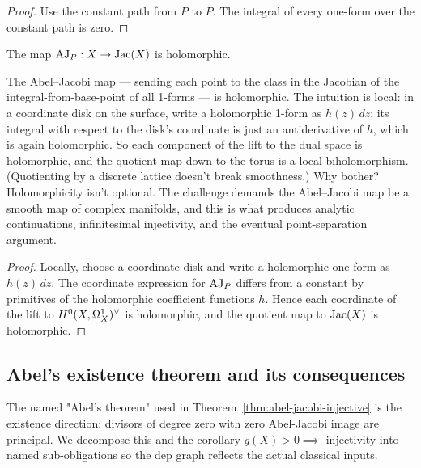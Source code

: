 \begin{proof}
\leanok
Use the constant path from \(P\) to \(P\). The integral of every one-form over
the constant path is zero.
\end{proof}

\begin{lemma}
\label{lem:aj-holomorphic}
The map \(\operatorname{AJ}_P:X\to\operatorname{Jac}(X)\) is holomorphic.
\leanok
\end{lemma}

\begin{layman}
The Abel--Jacobi map --- sending each point to the class in the Jacobian
of the integral-from-base-point of all 1-forms --- is holomorphic. The
intuition is local: in a coordinate disk on the surface, write a
holomorphic 1-form as \(h(z)\,dz\); its integral with respect to the
disk's coordinate is just an antiderivative of \(h\), which is again
holomorphic. So each component of the lift to the dual space is
holomorphic, and the quotient map down to the torus is a local
biholomorphism. (Quotienting by a discrete lattice doesn't break
smoothness.) Why bother? Holomorphicity isn't optional. The challenge
demands the Abel--Jacobi map be a smooth map of complex manifolds, and
this is what produces analytic continuations, infinitesimal injectivity,
and the eventual point-separation argument.
\end{layman}

\begin{proof}
\leanok
Locally, choose a coordinate disk and write a holomorphic one-form as
\(h(z)\,dz\). The coordinate expression for \(\operatorname{AJ}_P\) differs from a constant
by primitives of the holomorphic coefficient functions \(h\). Hence each
coordinate of the lift to \(H^{0}(X,\Omega^{1}_{X})^{\vee}\) is holomorphic, and the quotient map to
\(\operatorname{Jac}(X)\) is holomorphic.
\end{proof}

\subsection{Abel's existence theorem and its consequences}

The named "Abel's theorem" used in
Theorem~\ref{thm:abel-jacobi-injective} is the existence direction:
divisors of degree zero with zero Abel-Jacobi image are principal. We
decompose this and the corollary \(g(X)>0 \implies\) injectivity into named
sub-obligations so the dep graph reflects the actual classical inputs.


